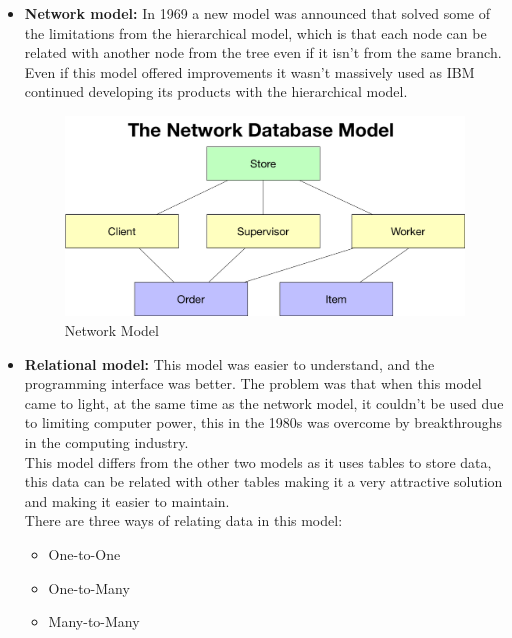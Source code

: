 \begin{itemize}
	\item {\textbf{Network model:} In 1969 a new model was announced that solved some of the limitations from the hierarchical model, which is that each node can be related with another node from the tree even if it isn’t from the same branch. Even if this model offered improvements it wasn’t massively used as IBM continued developing its products with the hierarchical model.
	\begin{center}
		\begin{figure}[h!]
			\centering
			\includegraphics[scale=0.25]{./images/3-network-model}
			\caption{Network Model}
			\label{net_model}
		\end{figure}
	\end{center}
	}
	\item {\textbf{Relational model:} This model was easier to understand, and the programming interface was better. The problem was that when this model came to light, at the same time as the network model, it couldn’t be used due to limiting computer power, this in the 1980s was overcome by breakthroughs in the computing industry.\\
	This model differs from the other two models as it uses tables to store data, this data can be related with other tables making it a very attractive solution and making it easier to maintain.\\
	There are three ways of relating data in this model:
	\begin{itemize}
		\item {One-to-One}
		\item {One-to-Many}
		\item {Many-to-Many}
	\end{itemize}
	\begin{center}
		\begin{figure}[h!]
			\centering

\end{figure}
\end{center}}
\end{itemize}
